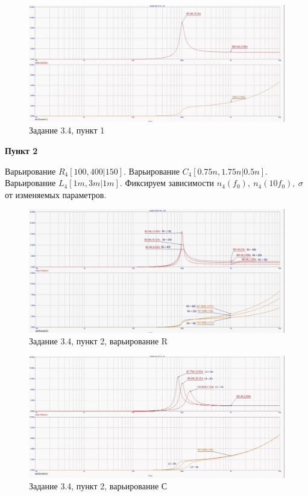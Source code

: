 \documentclass[a4paper, 14pt]{extarticle}%
\begin{document}
\begin{figure}[h!]
			\centering
			\includegraphics[width=1.1\linewidth]{3/3_3_6.jpg}
			\caption{Задание 3.4, пункт 1}
			\label{A}
\end{figure}

\textbf{Пункт 2}

Варьирование $R_4[100, 400 | 150]$.
\newline
Варьирование $C_4[0.75n, 1.75n | 0.5n]$.
\newline
Варьирование $L_4[1m, 3m | 1m]$.
\newline
Фиксируем зависимости $n_4(f_0), \: n_4(10f_0), \: \sigma$ от изменяемых параметров.

\begin{figure}[h!]
			\centering
			\includegraphics[width=1.1\linewidth]{3/3_4_3.jpg}
			\caption{Задание 3.4, пункт 2, варьирование R}
			\label{A}
\end{figure}


\begin{figure}[h!]
			\centering
			\includegraphics[width=1.1\linewidth]{3/3_4_2.jpg}
			\caption{Задание 3.4, пункт 2, варьирование С}
			\label{A}
\end{figure}
\end{document}
